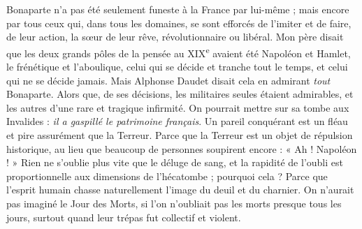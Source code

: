 \documentclass[french,twoside]{book} %
\begin{document}
Bonaparte n’a pas été seulement funeste à la France par lui-même ; mais encore par tous ceux qui, dans tous les domaines, se sont efforcés de l’imiter et de faire, de leur action, la sœur de leur rêve, révolutionnaire ou libéral. Mon père disait que les deux grands pôles de la pensée au XIX\textsuperscript{e} avaient été Napoléon et Hamlet, le frénétique et l’aboulique, celui qui se décide et tranche tout le temps, et celui qui ne se décide jamais. Mais Alphonse Daudet disait cela en admirant {\itshape tout} Bonaparte. Alors que, de ses décisions, les militaires seules étaient admirables, et les autres d’une rare et tragique infirmité. On pourrait mettre sur sa tombe aux Invalides : {\itshape il a gaspillé le patrimoine français}. Un pareil conquérant est un fléau et pire assurément que la Terreur. Parce que la Terreur est un objet de répulsion historique, au lieu que beaucoup de personnes soupirent encore : « Ah ! Napoléon ! » Rien ne s’oublie plus vite que le déluge de sang, et la rapidité de l’oubli est proportionnelle aux dimensions de l’hécatombe ; pourquoi cela ? Parce que l’esprit humain chasse naturellement l’image du deuil et du charnier. On n’aurait pas imaginé le Jour des Morts, si l’on n’oubliait pas les morts presque tous les jours, surtout quand leur trépas fut collectif et violent.\par
\end{document}
